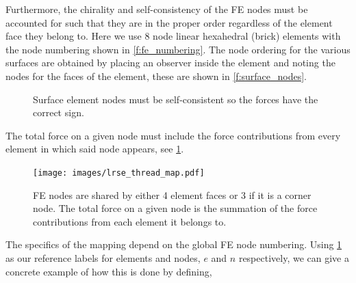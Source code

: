 \documentclass[11pt]{iopart}
\begin{document}
Furthermore, the chirality and self-consistency of the  FE nodes must be accounted for such that they are in the proper order regardless of the element face they belong to. Here we use 8  node linear hexahedral (brick) elements with the node numbering shown in \cref{f:fe_numbering}. The node ordering for the various surfaces are obtained by placing an observer inside the element and noting the nodes for the faces of the element, these are shown in \cref{f:surface_nodes}.
%
\begin{figure}
    \centering
    \hfill
    \caption{Surface element nodes must be self-consistent so the forces have the correct sign.}
\end{figure}
%
The total force on a given node must include the force contributions from every element in which said node appears, see \cref{f:shared_node}.
%
\begin{figure}
    \centering
    \texttt{[image: images/lrse\_thread\_map.pdf]}
    \caption{FE nodes are shared by either 4 element faces or 3 if it is a corner node. The total force on a given node is the summation of the force contributions from each element it belongs to.}
    \label{f:shared_node}
\end{figure}
%
The specifics of the mapping depend on the global FE node numbering. Using \cref{f:shared_node} as our reference labels for elements and nodes, $e$ and $n$ respectively, we can give a concrete example of how this is done by defining,
\end{document}
